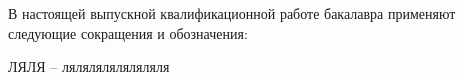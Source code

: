 В настоящей выпускной квалификационной работе бакалавра применяют следующие сокращения и обозначения:
\bigskip

\noindent ЛЯЛЯ -- ляляляляляляляля\bigskip


